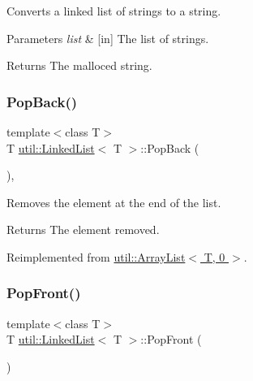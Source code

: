 Converts a linked list of strings to a string. 


\begin{DoxyParams}{Parameters}
{\em list} & \mbox{[}in\mbox{]} The list of strings. \\
\hline
\end{DoxyParams}
\begin{DoxyReturn}{Returns}
The malloced string. 
\end{DoxyReturn}
\mbox{\label{classutil_1_1LinkedList_ac7f5e9d19d9886b6b0b22232fc001424}} 
\subsubsection{\texorpdfstring{Pop\+Back()}{PopBack()}}
{\footnotesize\ttfamily template$<$class T$>$ \\
T \hyperlink{classutil_1_1LinkedList}{util\+::\+Linked\+List}$<$ T $>$\+::Pop\+Back (\begin{DoxyParamCaption}{ }\end{DoxyParamCaption})\hspace{0.3cm}{\ttfamily [inline]}, {\ttfamily [virtual]}}



Removes the element at the end of the list. 

\begin{DoxyReturn}{Returns}
The element removed. 
\end{DoxyReturn}


Reimplemented from \hyperlink{classutil_1_1ArrayList_ac03915c0d58b62bf78148737be86fafc}{util\+::\+Array\+List$<$ T, 0 $>$}.

\mbox{\label{classutil_1_1LinkedList_a07c6ba47539024e050d1fb4d2498632e}} 
\subsubsection{\texorpdfstring{Pop\+Front()}{PopFront()}}
{\footnotesize\ttfamily template$<$class T$>$ \\
T \hyperlink{classutil_1_1LinkedList}{util\+::\+Linked\+List}$<$ T $>$\+::Pop\+Front (\begin{DoxyParamCaption}{ }\end{DoxyParamCaption})\hspace{0.3cm}{\ttfamily [inline]}}



